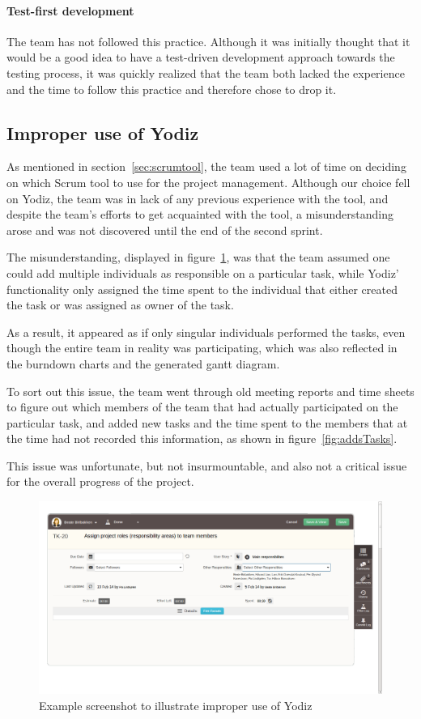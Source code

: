 \paragraph{Test-first development}
The team has not followed this practice. Although it was initially thought that it would be a good idea to have a test-driven development approach towards the testing process, it was quickly realized that the team both lacked the experience and the time to follow this practice and therefore chose to drop it.


\subsection{Improper use of Yodiz}
\label{sec:improperScrum}
As mentioned in section~\ref{sec:scrumtool}, the team used a lot of time on
deciding on which Scrum tool to use for the project management. Although our
choice fell on Yodiz, the team was in lack of any previous experience with the
tool, and despite the team's efforts to get acquainted with the tool, a
misunderstanding arose and was not discovered until the end of the second
sprint.

The misunderstanding, displayed in figure~\ref{fig:wrongUse}, was that the team
assumed one could add multiple individuals as responsible on a particular task,
while Yodiz' functionality only assigned the time spent to the individual that
either created the task or was assigned as owner of the task.

As a result, it appeared as if only singular individuals performed the tasks,
even though the entire team in reality was participating, which was also
reflected in the burndown charts and the generated gantt diagram. 

To sort out this issue, the team went through old meeting reports and time sheets
to figure out which members of the team that had actually participated on the
particular task, and added new tasks and the time spent to the members that at
the time had not recorded this information, as shown in
figure~\ref{fig:addsTasks}.

This issue was unfortunate, but not insurmountable, and also not a critical
issue for the overall progress of the project.

\begin{figure}[H]
\includegraphics[width=\textwidth]{ch/devProcess/fig/wrongUse.png}
\caption{Example screenshot to illustrate improper use of Yodiz}
\label{fig:wrongUse}
\end{figure}


